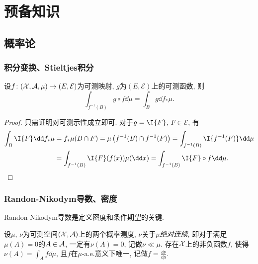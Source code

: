 \section{预备知识}

\subsection{概率论}

\subsubsection{积分变换、Stieltjes积分}

\begin{theorem}[积分变换]\label{thm:IntegralTransform}
	设$f \colon (\mathcal{X}, \mathcal{A}, \mu) \to (E, \mathcal{E})$为可测映射, $g$为$(E, \mathcal{E})$上的可测函数, 则
	\begin{equation*}
		\int_{f^{-1}(B)} g \circ f \dd \mu 
		= \int_B g \dd f_* \mu. 
	\end{equation*}
\end{theorem}
\begin{proof}
	只需证明对可测示性成立即可. 
	对于$g = \I{F}$, $F \in \mathcal{E}$, 有
	\begin{align*}
		\int_B \I{F} \dd f_* \mu
		&= f_* \mu(B \cap F)
		= \mu \left( f^{-1}(B) \cap f^{-1}(F) \right)
		= \int_{f^{-1}(B)} \I{f^{-1}(F)} \dd \mu \\
		&= \int_{f^{-1}(B)} \I{F}(f(x)) \mu(\dd x)
		=\int_{f^{-1}(B)} \I{F} \circ f \dd \mu. 
	\end{align*}
\end{proof}




\subsubsection{Randon-Nikodym导数、密度}

Randon-Nikodym导数是定义密度和条件期望的关键. 

\begin{theorem}
	设$\mu$, $\nu$为可测空间$(\mathcal{X}, \mathcal{A})$上的两个概率测度, $\nu$关于$\mu$\emph{绝对连续}, 即对于满足$\mu(A) = 0$的$A \in \mathcal{A}$, 一定有$\nu(A) = 0$, 记做$\nu \ll \mu$. 
	存在$\mathcal{X}$上的非负函数$f$, 使得$\nu(A) = \int_A f \dd \mu$, 且$f$在$\mu$-a.e.意义下唯一, 记做$f = \frac{\dd \nu}{\dd \mu}$. 
\end{theorem}

